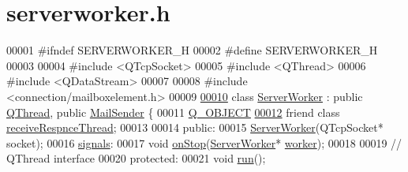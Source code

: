 \hypertarget{a00110_source}{}\section{serverworker.\+h}
\label{a00110_source}

\begin{DoxyCode}
00001 \textcolor{preprocessor}{#}\textcolor{preprocessor}{ifndef} \textcolor{preprocessor}{SERVERWORKER\_H}
00002 \textcolor{preprocessor}{#}\textcolor{preprocessor}{define} \textcolor{preprocessor}{SERVERWORKER\_H}
00003 
00004 \textcolor{preprocessor}{#}\textcolor{preprocessor}{include} \textcolor{preprocessor}{<}\textcolor{preprocessor}{QTcpSocket}\textcolor{preprocessor}{>}
00005 \textcolor{preprocessor}{#}\textcolor{preprocessor}{include} \textcolor{preprocessor}{<}\textcolor{preprocessor}{QThread}\textcolor{preprocessor}{>}
00006 \textcolor{preprocessor}{#}\textcolor{preprocessor}{include} \textcolor{preprocessor}{<}\textcolor{preprocessor}{QDataStream}\textcolor{preprocessor}{>}
00007 
00008 \textcolor{preprocessor}{#}\textcolor{preprocessor}{include} \textcolor{preprocessor}{<}\textcolor{preprocessor}{connection}\textcolor{preprocessor}{/}\textcolor{preprocessor}{mailboxelement}\textcolor{preprocessor}{.}\textcolor{preprocessor}{h}\textcolor{preprocessor}{>}
00009 
\hyperlink{a00185}{00010} \textcolor{keyword}{class} \hyperlink{a00185_ab80ef665f93d81c71a83aa42f8d888df}{ServerWorker} : \textcolor{keyword}{public} \hyperlink{a00185_ab80ef665f93d81c71a83aa42f8d888df}{QThread}, \textcolor{keyword}{public} 
      \hyperlink{a00205}{MailSender} \{
00011   \hyperlink{a00185_ab80ef665f93d81c71a83aa42f8d888df}{Q\_OBJECT}
\hyperlink{a00185_a767ca3da04cac0be47d1ee1da9eea938}{00012}   \textcolor{keyword}{friend} \textcolor{keyword}{class} \hyperlink{a00185_ab80ef665f93d81c71a83aa42f8d888df}{receiveRespnceThread};
00013 
00014  \textcolor{keyword}{public}:
00015   \hyperlink{a00185_aa8aee43d415cf337417a1d1f180ef03a}{ServerWorker}(QTcpSocket* socket);
00016  \hyperlink{a00185_ab80ef665f93d81c71a83aa42f8d888df}{signals}:
00017   \textcolor{keywordtype}{void} \hyperlink{a00185_ab80ef665f93d81c71a83aa42f8d888df}{onStop}(\hyperlink{a00185_ab80ef665f93d81c71a83aa42f8d888df}{ServerWorker}* \hyperlink{a00185_ab80ef665f93d81c71a83aa42f8d888df}{worker});
00018 
00019   \textcolor{comment}{// QThread interface}
00020  \textcolor{keyword}{protected}:
00021   \textcolor{keywordtype}{void} \hyperlink{a00185_a8b4f9a11d13f0b4990ae72f87da010df}{run}();

\end{DoxyCode}
